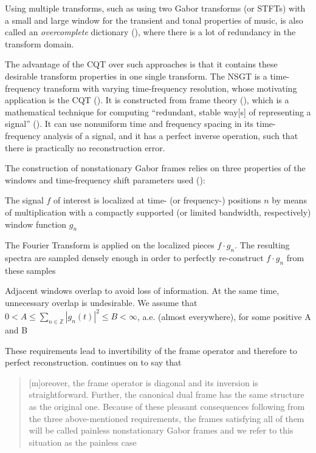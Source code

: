 \documentclass[report.tex]{subfiles}
\begin{document}
Using multiple transforms, such as using two Gabor transforms (or STFTs) with a small and large window for the transient and tonal properties of music, is also called an \textit{overcomplete} dictionary (\cite{dictionary}), where there is a lot of redundancy in the transform domain.

The advantage of the CQT over such approaches is that it contains these desirable transform properties in one single transform. The NSGT is a time-frequency transform with varying time-frequency resolution, whose motivating application is the CQT (\cite{jaillet, balazs}). It is constructed from frame theory (\cite{frametheory}), which is a mathematical technique for computing ``redundant, stable way[s] of representing a signal'' (\cite{framesintro}). It can use nonuniform time and frequency spacing in its time-frequency analysis of a signal, and it has a perfect inverse operation, such that there is practically no reconstruction error.

The construction of nonstationary Gabor frames relies on three properties of the windows and time-frequency shift parameters used (\cite{balazs}):
\begin{tight_itemize}
	\item
		The signal $f$ of interest is localized at time- (or frequency-) positions $n$ by means of multiplication with a compactly supported (or limited bandwidth, respectively) window function $g_{n}$
	\item
		The Fourier Transform is applied on the localized pieces $f \cdot g_{n}$. The resulting spectra are sampled densely enough in order to perfectly re-construct $f \cdot g_{n}$ from these samples
	\item
		Adjacent windows overlap to avoid loss of information. At the same time, unnecessary overlap is undesirable. We assume that $0 < A \le \sum_{n \in \mathbb{Z}}|g_{n}(t)|^{2} \le B < \infty$, a.e. (almost everywhere), for some positive A and B
\end{tight_itemize}

These requirements lead to invertibility of the frame operator and therefore to perfect reconstruction. \textcite{balazs} continues on to say that

\begin{quote}
	[m]oreover, the frame operator is diagonal and its inversion is straightforward. Further, the canonical dual frame has the same structure as the original one. Because of these pleasant consequences following from the three above-mentioned requirements, the frames satisfying all of them will be called painless nonstationary Gabor frames and we refer to this situation as the painless case
\end{quote}
\end{document}
